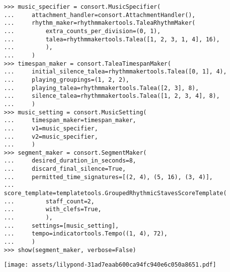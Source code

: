 \begin{abjadbookoutput}
\begin{singlespacing}
\vspace{-0.5\baselineskip}
\begin{lstlisting}
>>> music_specifier = consort.MusicSpecifier(
...     attachment_handler=consort.AttachmentHandler(),
...     rhythm_maker=rhythmmakertools.TaleaRhythmMaker(
...         extra_counts_per_division=(0, 1),
...         talea=rhythmmakertools.Talea([1, 2, 3, 1, 4], 16),
...         ),
...     )
>>> timespan_maker = consort.TaleaTimespanMaker(
...     initial_silence_talea=rhythmmakertools.Talea([0, 1], 4),
...     playing_groupings=(1, 2, 2),
...     playing_talea=rhythmmakertools.Talea([2, 3], 8),
...     silence_talea=rhythmmakertools.Talea([1, 2, 3, 4], 8),
...     )
>>> music_setting = consort.MusicSetting(
...     timespan_maker=timespan_maker,
...     v1=music_specifier,
...     v2=music_specifier,
...     )
>>> segment_maker = consort.SegmentMaker(
...     desired_duration_in_seconds=8,
...     discard_final_silence=True,
...     permitted_time_signatures=[(2, 4), (5, 16), (3, 4)],
...     score_template=templatetools.GroupedRhythmicStavesScoreTemplate(
...         staff_count=2,
...         with_clefs=True,
...         ),
...     settings=[music_setting],
...     tempo=indicatortools.Tempo((1, 4), 72),
...     )
>>> show(segment_maker, verbose=False)
\end{lstlisting}
\noindent\texttt{[image: assets/lilypond-31ad7eaab600ca94fc940e6c050a8651.pdf]}
\end{singlespacing}
\end{abjadbookoutput}

\begin{comment}
<abjad>[stylesheet=../consort.ily]
music_specifier = new(
    music_specifier,
    attachment_handler__accents=consort.AttachmentExpression(
        attachments=Articulation('accent'),
        selector=selectortools.Selector().by_leaves()[0],
        ),
    )
music_setting = new(
    music_setting,
    v1=music_specifier,
    v2=music_specifier,
    )
segment_maker = new(segment_maker, settings=[music_setting])
show(segment_maker,verbose=False)
</abjad>
\end{comment}

